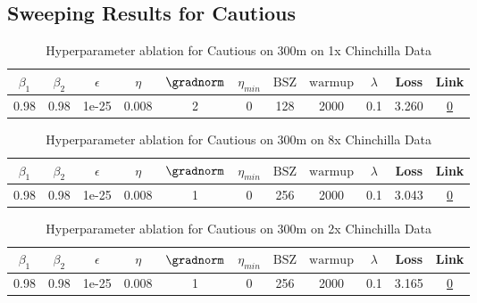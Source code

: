 \subsection{Sweeping Results for Cautious}%
\begin{table}[H]
\centering
\caption{Hyperparameter ablation for Cautious on 300m on 1x Chinchilla Data}
\label{tab:ablation_cautious_300m_1}
\begin{tabular}{ccccccccccc}
\toprule
$\beta_1$ & $\beta_2$ & $\epsilon$ & $\eta$ & $\gradnorm$ & $\eta_{min}$ & $\mathrm{BSZ}$ & $\mathrm{warmup}$ & $\lambda$ & Loss & Link \\
\midrule
0.98 & 0.98 & 1e-25 & 0.008 & 2 & 0 & 128 & 2000 & 0.1 & 3.260 & \href{https://wandb.ai/stanford-mercury/optimizer-scaling/runs/sweep-300m-6B-cautiousc8346clr0.008-wd0.1-minlr0-warmup2000-b10.-852297}{0} \\
\midrule
\bottomrule
\end{tabular}
\end{table}

\begin{table}[H]
\centering
\caption{Hyperparameter ablation for Cautious on 300m on 8x Chinchilla Data}
\label{tab:ablation_cautious_300m_8}
\begin{tabular}{ccccccccccc}
\toprule
$\beta_1$ & $\beta_2$ & $\epsilon$ & $\eta$ & $\gradnorm$ & $\eta_{min}$ & $\mathrm{BSZ}$ & $\mathrm{warmup}$ & $\lambda$ & Loss & Link \\
\midrule
0.98 & 0.98 & 1e-25 & 0.008 & 1 & 0 & 256 & 2000 & 0.1 & 3.043 & \href{https://wandb.ai/stanford-mercury/optimizer-scaling/runs/sweep-300m-48B-cautious1c558clr0.008-wd0.1-minlr0-warmup2000-b10-cae294}{0} \\
\midrule
\bottomrule
\end{tabular}
\end{table}

\begin{table}[H]
\centering
\caption{Hyperparameter ablation for Cautious on 300m on 2x Chinchilla Data}
\label{tab:ablation_cautious_300m_2}
\begin{tabular}{ccccccccccc}
\toprule
$\beta_1$ & $\beta_2$ & $\epsilon$ & $\eta$ & $\gradnorm$ & $\eta_{min}$ & $\mathrm{BSZ}$ & $\mathrm{warmup}$ & $\lambda$ & Loss & Link \\
\midrule
0.98 & 0.98 & 1e-25 & 0.008 & 1 & 0 & 256 & 2000 & 0.1 & 3.165 & \href{https://wandb.ai/stanford-mercury/optimizer-scaling/runs/sweep-300m-12B-cautious008d65lr0.008-wd0.1-minlr0-warmup2000-b10-69dcda}{0} \\
\midrule
\bottomrule
\end{tabular}
\end{table}

